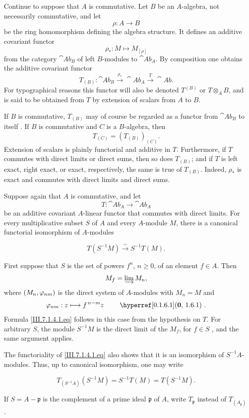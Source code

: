 \begin{env}[7.1.3]
\label{III.7.1.3}
Continue to suppose that $A$ is commutative.  Let $B$ be an
$A$-algebra, not necessarily commutative, and let
\[
  \rho:A\longrightarrow B
\]
be the ring homomorphism defining the algebra structure.  It
defines an
additive covariant functor
\[
  \rho_*:M\longmapsto M_{[\rho]}
\]
from the category $\cat{Ab}_B$ of left $B$-modules to
$\cat{Ab}_A$.  By composition one obtains the additive
covariant functor
\[
  T_{(B)}:
  \cat{Ab}_B
  \xrightarrow{\rho_*}
  \cat{Ab}_A
  \xrightarrow{T}
  \cat{Ab}.
\]
For typographical reasons this functor will also be denoted
$T^{(B)}$ or $T\otimes_AB$, and is said to be obtained from $T$
by extension of scalars from $A$ to $B$.

If $B$ is commutative, $T_{(B)}$ may of course be regarded as a
functor from $\cat{Ab}_B$ to itself .  If $B$ is
commutative and $C$ is a $B$-algebra, then
\[
  T_{(C)}=(T_{(B)})_{(C)}.
\]
Extension of scalars is plainly functorial and additive in
$T$.  Furthermore, if $T$ commutes with direct limits or direct
sums, then so does $T_{(B)}$; and if $T$ is left exact, right
exact, or exact, respectively, the same is true of $T_{(B)}$.
Indeed, $\rho_*$ is exact and commutes with direct limits and
direct sums.
\end{env}

\begin{env}[7.1.4]
\label{III.7.1.4}
Suppose again that $A$ is commutative, and let
\[
  T:\cat{Ab}_A\longrightarrow\cat{Ab}_A
\]
be an additive covariant $A$-linear functor that commutes with
direct limits.  For every multiplicative subset $S$ of $A$ and
every $A$-module $M$, there is a canonical functorial
isomorphism of $A$-modules
\begin{env}[7.1.4.1]
\label{III.7.1.4.1}
\[
  T(S^{-1}M)
  \xrightarrow{\sim}
  S^{-1}T(M).
  \tag{7.1.4.1}\label{III.7.1.4.1.eq}
\]
\end{env}

First suppose that $S$ is the set of powers $f^n$,
$n\geq0$, of an element $f\in A$.  Then
\[
  M_f=\varinjlim M_n,
\]
where $(M_n,\varphi_{nm})$ is the direct system of $A$-modules
with $M_n=M$ and
\[
  \vphi_{nm}:z\longmapsto f^{\,n-m}z
  \qquad\text{\sref[0]{0.1.6.1}}.
\]
Formula \eqref{III.7.1.4.1.eq} follows in this case from the
hypothesis on $T$.  For arbitrary $S$, the module $S^{-1}M$ is
the direct limit of the $M_f$, for $f\in S$
, and the same argument applies.

The functoriality of \eqref{III.7.1.4.1.eq} also shows that it
is an isomorphism of $S^{-1}A$-modules.  Thus, up to canonical
isomorphism, one may write
\begin{env}[7.1.4.2]
\label{III.7.1.4.2}
\[
  T_{(S^{-1}A)}(S^{-1}M)
  =
  S^{-1}T(M)
  =
  T(S^{-1}M).
  \tag{7.1.4.2}\label{III.7.1.4.2.eq}
\]
\end{env}
If $S=A-\mathfrak p$ is the complement of a prime ideal
$\mathfrak p$ of $A$, write $T_{\mathfrak p}$ instead of
$T_{(A_{\mathfrak p})}$.
\end{env}


